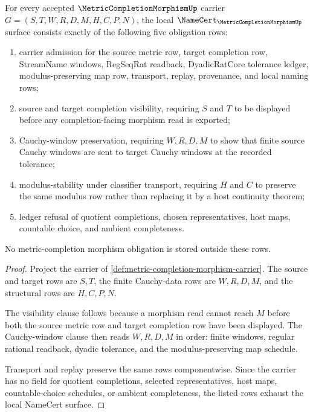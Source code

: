 \begin{theorem}
\label{thm:metric-completion-morphism-namecert-obligations}
For every accepted $\MetricCompletionMorphismUp$ carrier $G=(S,T,W,R,D,M,H,C,P,N)$, the local $\NameCert_{\MetricCompletionMorphismUp}$ surface consists exactly of the following five obligation rows:
\begin{enumerate}
\item carrier admission for the source metric row, target completion row, StreamName windows, RegSeqRat readback, DyadicRatCore tolerance ledger, modulus-preserving map row, transport, replay, provenance, and local naming rows;
\item source and target completion visibility, requiring $S$ and $T$ to be displayed before any completion-facing morphism read is exported;
\item Cauchy-window preservation, requiring $W,R,D,M$ to show that finite source Cauchy windows are sent to target Cauchy windows at the recorded tolerance;
\item modulus-stability under classifier transport, requiring $H$ and $C$ to preserve the same modulus row rather than replacing it by a host continuity theorem;
\item ledger refusal of quotient completions, chosen representatives, host maps, countable choice, and ambient completeness.
\end{enumerate}
No metric-completion morphism obligation is stored outside these rows.
\end{theorem}
\begin{proof}
Project the carrier of \autoref{def:metric-completion-morphism-carrier}. The source and target rows are $S,T$, the finite Cauchy-data rows are $W,R,D,M$, and the structural rows are $H,C,P,N$.

The visibility clause follows because a morphism read cannot reach $M$ before both the source metric row and target completion row have been displayed. The Cauchy-window clause then reads $W,R,D,M$ in order: finite windows, regular rational readback, dyadic tolerance, and the modulus-preserving map schedule.

Transport and replay preserve the same rows componentwise. Since the carrier has no field for quotient completions, selected representatives, host maps, countable-choice schedules, or ambient completeness, the listed rows exhaust the local NameCert surface.
\end{proof}

